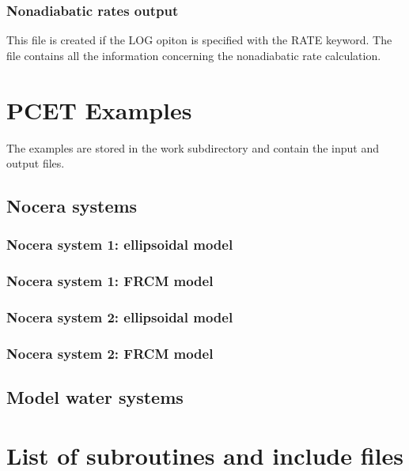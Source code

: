 \documentclass[oneside,11pt,openany]{book}
\newcommand{\tw}{\ttfamily}
\begin{document}
\subsection{Nonadiabatic rates output}
This file is created if the {\tw LOG} opiton is specified
with the {\tw RATE} keyword. The file contains all the information
concerning the nonadiabatic rate calculation.


\chapter{PCET Examples}
The examples are stored in the {\tw work} subdirectory
and contain the input and output files.
%
\section{Nocera systems}
%
\subsection{Nocera system 1: ellipsoidal model}

%
\subsection{Nocera system 1: FRCM model}

%
\subsection{Nocera system 2: ellipsoidal model}

%
\subsection{Nocera system 2: FRCM model}

%
\section{Model water systems}
%


\chapter{List of subroutines and include files}
%
\end{document}
